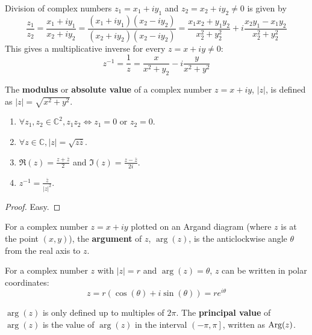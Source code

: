 \begin{definition}
	Division of complex numbers $z_1 = x_1 + i y_1$ and $z_2 = x_2 + i y_2 \ne 0$ is given by
	\[
		\frac{z_1}{z_2} = \frac{x_1 + i y_1}{x_2 + i y_2} = \frac{(x_1 + i y_1) (x_2 - i y_2)}{(x_2 + i y_2) (x_2 - i y_2)} = \frac{x_1 x_2 + y_1 y_2}{x_2^2 + y_2^2} + i \frac{x_2 y_1 - x_1 y_2}{x_2^2 + y_2^2}
	\]
	This gives a multiplicative inverse for every $z = x + iy \ne 0$:
	\[
		z^{-1} = \frac{1}{z} = \frac{x}{x^2 + y_2} - i \frac{y}{x^2 + y^2}
	\]
\end{definition}

\begin{definition}
	The \textbf{modulus} or \textbf{absolute value} of a complex number $z = x + iy$, $|z|$, is defined as $|z| = \sqrt{x^2 + y^2}$.
\end{definition}

\begin{lemma}
	\hfill
	\begin{enumerate}
		\item $\forall z_1, z_2 \in \mathbb{C}^2, z_1 z_2 \Longleftrightarrow z_1 = 0 \text{ or } z_2 = 0$.
		\item $\forall z \in \mathbb{C}, |z| = \sqrt{z \overline{z}}$.
		\item $\Re(z) = \frac{z + \overline{z}}{2}$ and $\Im(z) = \frac{z - \overline{z}}{2i}$.
		\item $z^{-1} = \frac{\overline{z}}{|z|^2}$.
	\end{enumerate}
\end{lemma}

\begin{proof}
	Easy.
\end{proof}

\begin{definition}
	For a complex number $z = x + iy$ plotted on an Argand diagram (where $z$ is at the point $(x, y)$), the \textbf{argument} of $z$, $\arg(z)$, is the anticlockwise angle $\theta$ from the real axis to $z$.
\end{definition}

\begin{definition}
	For a complex number $z$ with $|z| = r$ and $\arg(z) = \theta$, $z$ can be written in polar coordinates:
	\[
		z = r(\cos(\theta) + i \sin(\theta)) = r e^{i \theta}
	\]
\end{definition}

\begin{definition}
	$\arg(z)$ is only defined up to multiples of $2 \pi$. The \textbf{principal value} of $\arg(z)$ is the value of $\arg(z)$ in the interval $\left(-\pi, \pi \right]$, written as $\text{Arg}(z)$.
\end{definition}


